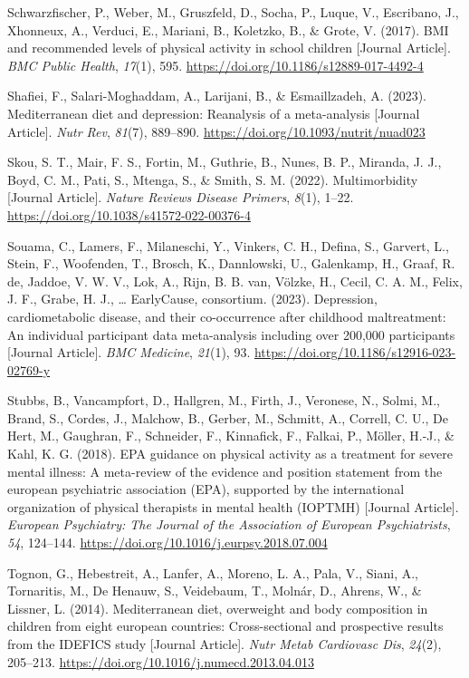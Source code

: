 \documentclass[
  letterpaper,
  DIV=11,
  numbers=noendperiod]{scrreport}
\newlength{\cslhangindent}
\newenvironment{CSLReferences}[2] %
 {\begin{list}{}{%
  \setlength{\itemindent}{0pt}
  \setlength{\leftmargin}{0pt}
  \setlength{\parsep}{0pt}
  \ifodd #1
   \setlength{\leftmargin}{\cslhangindent}
   \setlength{\itemindent}{-1\cslhangindent}
  \fi
  \setlength{\itemsep}{#2\baselineskip}}}
 {\end{list}}
\begin{document}
\begin{CSLReferences}{1}{0}
Schwarzfischer, P., Weber, M., Gruszfeld, D., Socha, P., Luque, V.,
Escribano, J., Xhonneux, A., Verduci, E., Mariani, B., Koletzko, B., \&
Grote, V. (2017). BMI and recommended levels of physical activity in
school children {[}Journal Article{]}. \emph{BMC Public Health},
\emph{17}(1), 595. \url{https://doi.org/10.1186/s12889-017-4492-4}

Shafiei, F., Salari-Moghaddam, A., Larijani, B., \& Esmaillzadeh, A.
(2023). Mediterranean diet and depression: Reanalysis of a meta-analysis
{[}Journal Article{]}. \emph{Nutr Rev}, \emph{81}(7), 889--890.
\url{https://doi.org/10.1093/nutrit/nuad023}

Skou, S. T., Mair, F. S., Fortin, M., Guthrie, B., Nunes, B. P.,
Miranda, J. J., Boyd, C. M., Pati, S., Mtenga, S., \& Smith, S. M.
(2022). Multimorbidity {[}Journal Article{]}. \emph{Nature Reviews
Disease Primers}, \emph{8}(1), 1--22.
\url{https://doi.org/10.1038/s41572-022-00376-4}

Souama, C., Lamers, F., Milaneschi, Y., Vinkers, C. H., Defina, S.,
Garvert, L., Stein, F., Woofenden, T., Brosch, K., Dannlowski, U.,
Galenkamp, H., Graaf, R. de, Jaddoe, V. W. V., Lok, A., Rijn, B. B. van,
Völzke, H., Cecil, C. A. M., Felix, J. F., Grabe, H. J., \ldots{}
EarlyCause, consortium. (2023). Depression, cardiometabolic disease, and
their co-occurrence after childhood maltreatment: An individual
participant data meta-analysis including over 200,000 participants
{[}Journal Article{]}. \emph{BMC Medicine}, \emph{21}(1), 93.
\url{https://doi.org/10.1186/s12916-023-02769-y}

Stubbs, B., Vancampfort, D., Hallgren, M., Firth, J., Veronese, N.,
Solmi, M., Brand, S., Cordes, J., Malchow, B., Gerber, M., Schmitt, A.,
Correll, C. U., De Hert, M., Gaughran, F., Schneider, F., Kinnafick, F.,
Falkai, P., Möller, H.-J., \& Kahl, K. G. (2018). EPA guidance on
physical activity as a treatment for severe mental illness: A
meta-review of the evidence and position statement from the european
psychiatric association (EPA), supported by the international
organization of physical therapists in mental health (IOPTMH) {[}Journal
Article{]}. \emph{European Psychiatry: The Journal of the Association of
European Psychiatrists}, \emph{54}, 124--144.
\url{https://doi.org/10.1016/j.eurpsy.2018.07.004}

Tognon, G., Hebestreit, A., Lanfer, A., Moreno, L. A., Pala, V., Siani,
A., Tornaritis, M., De Henauw, S., Veidebaum, T., Molnár, D., Ahrens,
W., \& Lissner, L. (2014). Mediterranean diet, overweight and body
composition in children from eight european countries: Cross-sectional
and prospective results from the IDEFICS study {[}Journal Article{]}.
\emph{Nutr Metab Cardiovasc Dis}, \emph{24}(2), 205--213.
\url{https://doi.org/10.1016/j.numecd.2013.04.013}


\end{CSLReferences}
\end{document}
